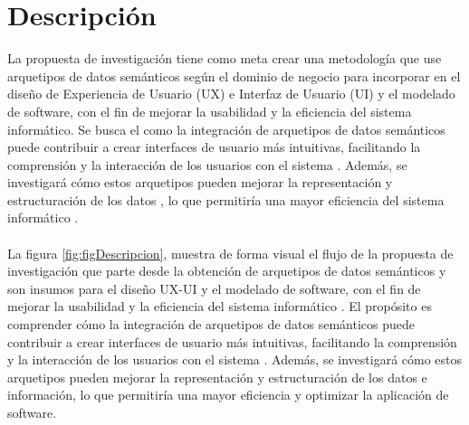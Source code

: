 \documentclass[12pt,a4paper]{article}
\begin{document}
\section{Descripción}
\label{sec:Description}
La propuesta de investigación tiene como meta crear una metodología que use arquetipos de datos semánticos según el dominio de negocio para incorporar en el diseño de Experiencia de Usuario (UX) e Interfaz de Usuario (UI) y el modelado de software, con el fin de mejorar la usabilidad y la eficiencia del sistema informático. Se busca el como la integración de arquetipos de datos semánticos
\cite{CardosodeMoraes2016}
\cite{Stavrakos2016}
puede contribuir a crear interfaces de usuario más intuitivas, facilitando la comprensión y la interacción de los usuarios con el sistema
\cite{Feras2022}
\cite{Marco-Ruiz2015a}
. Además, se investigará cómo estos arquetipos pueden mejorar la representación y estructuración de los datos
\cite{Piho2015}
\cite{Marco-Ruiz2015}
\cite{Allones2013}
, lo que permitiría una mayor eficiencia del sistema informático
\cite{Spath2011}
\cite{Epifanio2016}
\cite{Ragozini2017}
\cite{Qanbari2016}
. 
\\\\
La figura \ref{fig:figDescripcion}, muestra de forma visual el flujo de la propuesta de investigación que parte desde la obtención de arquetipos de datos semánticos y son insumos para el diseño UX-UI y el modelado de software, con el fin de mejorar la usabilidad y la eficiencia del sistema informático
\cite{Govinda2015}
\cite{Sari2012}
\cite{Qanbari2016}
. El propósito es comprender cómo la integración de arquetipos de datos semánticos puede contribuir a crear interfaces de usuario más intuitivas, facilitando la comprensión y la interacción de los usuarios con el sistema
\cite{Govinda2015}
\cite{Feras2022}
\cite{Kopanitsa2015}
. Además, se investigará cómo estos arquetipos pueden mejorar la representación y estructuración de los datos e información, lo que permitiría una mayor eficiencia y optimizar la aplicación de software.
\\
\end{document}
